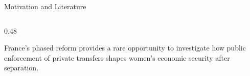 \documentclass[aspectratio=169,10pt]{beamer}
\begin{document}
\begin{frame}{Motivation and Literature}
\begin{columns}[T,onlytextwidth]
\begin{column}{0.48\textwidth}
    \begin{keybox}
        \footnotesize
        France's phased reform provides a rare
        opportunity to investigate how public
        enforcement of private transfers shapes
        women's economic security after separation.
    \end{keybox}
\end{column}

\end{columns}
\end{frame}



\end{document}
